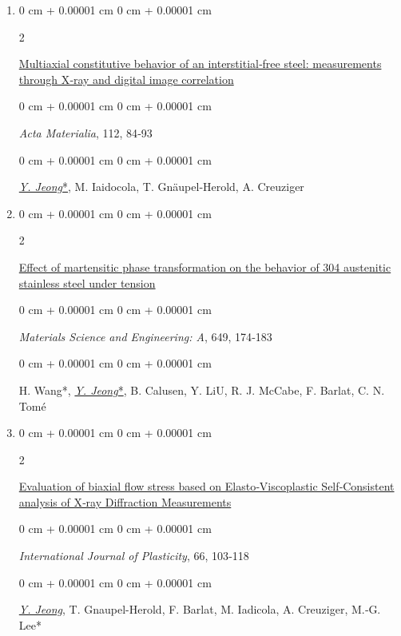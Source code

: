\documentclass[10pt, letterpaper]{article}
\newenvironment{onecolentry}{
    \begin{adjustwidth}{
        0 cm + 0.00001 cm
    }{
        0 cm + 0.00001 cm
    }
}{
    \end{adjustwidth}
} %
\newenvironment{twocolentry}[2][]{
    \onecolentry
    \def\secondColumn{#2}
    \setcolumnwidth{\fill, 4.5 cm}
    \begin{paracol}{2}
}{
    \switchcolumn \raggedleft \secondColumn
    \end{paracol}
    \endonecolentry
} %
\begin{document}
\begin{enumerate}
        \item
        \begin{twocolentry}{2016}
            \href{http://dx.doi.org/10.1016/j.actamat.2016.04.013}{Multiaxial constitutive behavior of an interstitial‑free steel: measurements through X‑ray and digital image correlation }
        \end{twocolentry}
        \begin{onecolentry}
            {\it Acta Materialia}, 112, 84‑93
        \end{onecolentry}
        \begin{onecolentry}
            {\underline{\textit{Y. Jeong}*}},  M. Iaidocola, T. Gnäupel‑Herold, A. Creuziger
        \end{onecolentry}
        \vspace{0.10 cm}


        \item
        \begin{twocolentry}{2016}
            \href{http://dx.doi.org/10.1016/j.msea.2015.09.108}{Effect of martensitic phase transformation on the behavior of 304 austenitic stainless steel under tension}
        \end{twocolentry}
        \begin{onecolentry}
            {\it Materials Science and Engineering: A}, 649, 174‑183
        \end{onecolentry}
        \begin{onecolentry}
            H. Wang*, {\underline{\textit{Y. Jeong}*}}, B. Calusen, Y. LiU, R. J. McCabe, F. Barlat, C. N. Tomé
        \end{onecolentry}
        \vspace{0.10 cm}



        \item
        \begin{twocolentry}{2015}
            \href{http://dx.doi.org/10.1016/j.ijplas.2014.06.009}{Evaluation of biaxial flow stress based on Elasto‑Viscoplastic Self‑Consistent analysis of X‑ray Diffraction Measurements}
        \end{twocolentry}
        \begin{onecolentry}
            {\it International Journal of Plasticity}, 66, 103‑118
        \end{onecolentry}
        \begin{onecolentry}
            {\underline{\textit{Y. Jeong}}}, T. Gnaupel-Herold, F. Barlat, M. Iadicola, A. Creuziger, M.‑G. Lee*
        \end{onecolentry}
        \vspace{0.10 cm}


\end{enumerate}
\end{document}
